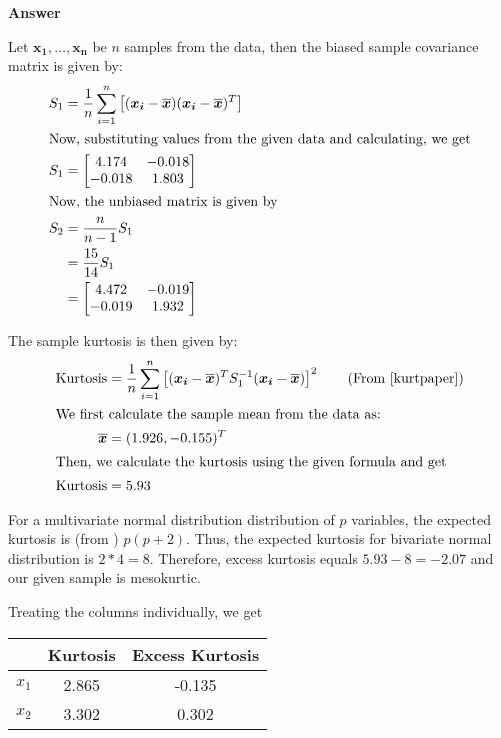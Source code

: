 \documentclass[12pt, oneside]{article}
\begin{document}
\begin{enumerate}
{    \textbf{Answer}

    Let \(\bm{x_1},\ldots,\bm{x_n}\) be \(n\) samples from the data, then the biased sample
    covariance matrix is given by:
    \begin{align*}
      S_1 &= \frac{1}{n} \sum_{i=1}^{n} \left[(\bm{x_i} - \bm{\overline{x}})(\bm{x_i} - \bm{\overline{x}})^T\right] \\
      \intertext{Now, substituting values from the given data and calculating, we get}
      S_1 &= \begin{bmatrix}
        4.174 & -0.018 \\
        -0.018 & 1.803
      \end{bmatrix} \\
      \intertext{Now, the unbiased matrix is given by}
      S_2 &= \frac{n}{n - 1} S_1 \\
        &= \frac{15}{14} S_1 \\
        &= \begin{bmatrix}
          4.472 & -0.019 \\
          -0.019 & 1.932
        \end{bmatrix}
    \end{align*}

    The sample kurtosis is then given by:
    \begin{align*}
      \text{Kurtosis} &= \frac{1}{n} \sum_{i=1}^{n} \left[(\bm{x_i} - \bm{\overline{x}})^T S_1^{-1} (\bm{x_i} - \bm{\overline{x}})\right]^2 \tag*{(From \cite{kurtpaper})} \\
      \intertext{We first calculate the sample mean from the data as:}
      \bm{\overline{x}} &= (1.926, -0.155)^T \\
      \intertext{Then, we calculate the kurtosis using the given formula and get}
      \text{Kurtosis} &= 5.93
    \end{align*}

    For a multivariate normal distribution distribution of \(p\) variables, the expected
    kurtosis is (from \cite{kurtpaper}) \(p(p + 2)\). Thus, the expected kurtosis for
    bivariate normal distribution is \(2 * 4 = 8\). Therefore, excess kurtosis equals 
    \(5.93 - 8 = -2.07\) and our given sample is mesokurtic.

    Treating the columns individually, we get

    \begin{center}
      \begin{tabular}{ccc}
        \toprule
        {} & Kurtosis & Excess Kurtosis \\
        \midrule
        \(x_1\) & 2.865 & -0.135 \\
        \(x_2\) & 3.302 & 0.302\\
        \bottomrule
      \end{tabular}
    \end{center}

}
\end{enumerate}
\end{document}
